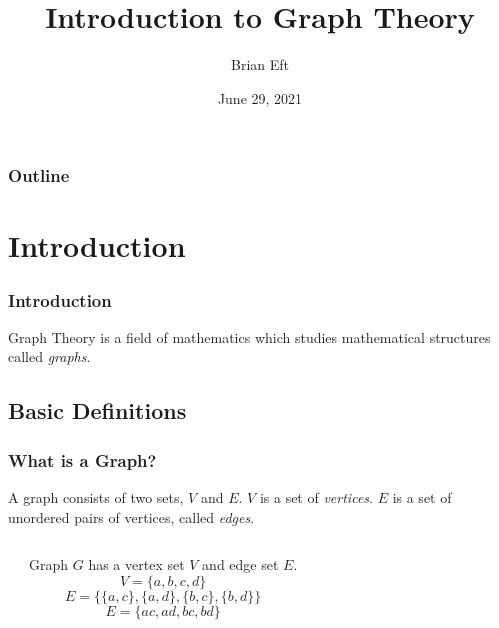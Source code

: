 \documentclass{beamer}
\title{Introduction to Graph Theory}
\author{Brian Eft}
\date{June 29, 2021}
\institute{Tech Elevator Columbus}
\theoremstyle{Plain}\newtheorem{kt}{Kuratowski's Theorem}
\theoremstyle{Definition}\newtheorem{te}{Tr\'emaux Exploration}
\theoremstyle{Definition}\newtheorem{dfs}{Depth-First Search}
\begin{document}
\begin{frame}
  \titlepage
\end{frame}

\begin{frame}
  \frametitle{Outline}
  \tableofcontents  
\end{frame}

\section{Introduction}
\begin{frame}
  \frametitle{Introduction}
    \begin{definition}
        \alert{Graph Theory} is a field of mathematics which studies mathematical structures called \emph{graphs}.
    \end{definition}
  
\end{frame}

\subsection{Basic Definitions}
\begin{frame}
  \frametitle{What is a Graph?}
  \begin{definition}
    A \alert{graph} consists of two sets, $V$ and $E$. $V$ is a set of
    \emph{vertices}. $E$ is a set of unordered pairs of vertices, called
    \emph{edges}.
  \end{definition}

  \pause
  \begin{example}
  \begin{columns}
    \begin{center}
    \end{center}
    Graph $G$ has a vertex set $V$ and edge set $E$.
    \begin{equation*}
      V = \{ a,b,c,d \}
    \end{equation*}
    \begin{equation*}
      E = \{\{a, c \}, \{a, d \}, \{b, c \}, \{b, d \}\}
    \end{equation*}
    \begin{equation*}
      E = \{ac,ad,bc,bd\}
    \end{equation*}
  \end{columns}
  \end{example}
\end{frame}
\end{document}
